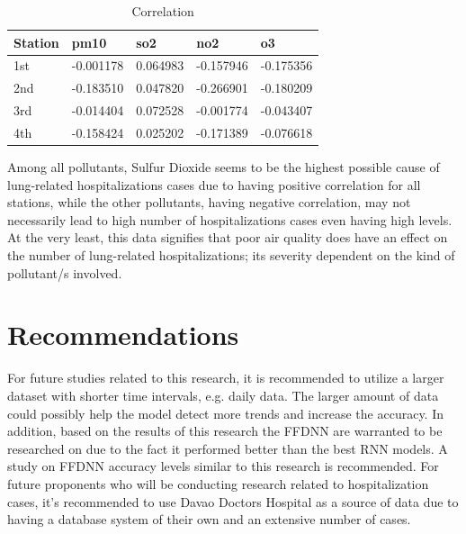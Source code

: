 \documentclass[10pt,11pt,12pt,oneside]{book}
\begin{document}
\begin{center}
\begin{table}
    \centering
    \begin{tabular}{|l|l|l|l|l|}
\toprule
Station    & pm10  & so2   & no2   & o3    \\
\hline
1st  & -0.001178 & 0.064983   & -0.157946    & -0.175356   \\
\hline
2nd  & -0.183510 & 0.047820 & -0.266901   & -0.180209   \\
\hline
3rd  & -0.014404 & 0.072528  & -0.001774 & -0.043407  \\
\hline
4th & -0.158424 & 0.025202 & -0.171389  & -0.076618    \\
\bottomrule
\end{tabular}
    \caption{Correlation }
    \label{table:correl}
\end{table}

\end{center}

Among all pollutants, Sulfur Dioxide seems to be the highest possible cause of lung-related hospitalizations cases due to having positive correlation for all stations, while the other pollutants, having negative correlation, may not necessarily lead to high number of hospitalizations cases even having high levels. At the very least, this data signifies that poor air quality does have an effect on the number of lung-related hospitalizations; its severity dependent on the kind of pollutant/s involved.


\section{Recommendations}
For future studies related to this research, it is recommended to utilize a larger dataset with shorter time intervals, e.g. daily data. The larger amount of data could possibly help the model detect more trends and increase the accuracy. 
In addition, based on the results of this research the FFDNN are warranted to be researched on due to the fact it performed better than the best RNN models. A study on FFDNN accuracy levels similar to this research is recommended.
For future proponents who will be conducting research related to hospitalization cases, it's recommended to use Davao Doctors Hospital as a source of data due to having a database system of their own and an extensive number of cases.
    
    
\end{document}
